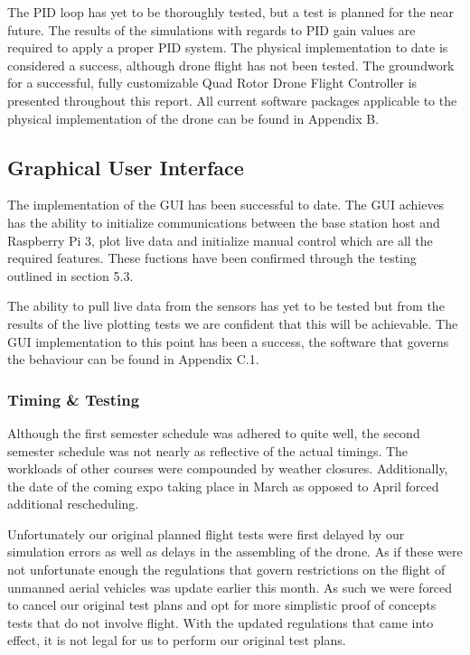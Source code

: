 The PID loop has yet to be thoroughly tested, but a test is planned for the near future. The results of the simulations with regards to PID gain values are required to apply a proper PID system. The physical implementation to date is considered a success, although drone flight has not been tested. The groundwork for a successful, fully customizable Quad Rotor Drone Flight Controller is presented throughout this report. All current software packages applicable to the physical implementation of the drone can be found in  Appendix B.

\subsection{Graphical User Interface}
The implementation of the GUI has been successful to date. The GUI achieves has the ability to initialize communications between the base station host and Raspberry Pi 3, plot live data and initialize manual control which are all the required features. These fuctions have been confirmed through the testing outlined in section 5.3.

The ability to pull live data from the sensors has yet to be tested but from the results of the live plotting tests we are confident that this will be achievable. The GUI implementation to this point has been a success, the software that governs the behaviour can be found in Appendix C.1.

\subsubsection{Timing \& Testing}
Although the first semester schedule was adhered to quite well, the second semester schedule was not nearly as reflective of the actual timings.  The workloads of other courses were compounded by weather closures.  Additionally, the date of the coming expo taking place in March as opposed to April forced additional rescheduling.

Unfortunately our original planned flight tests were first delayed by our simulation errors as well as delays in the assembling of the drone.  As if these were not unfortunate enough the regulations that govern restrictions on the flight of unmanned aerial vehicles was update earlier this month.  As such we were forced to cancel our original test plans and opt for more simplistic proof of concepts tests that do not involve flight.  With the updated regulations that came into effect, it is not legal for us to perform our original test plans.


